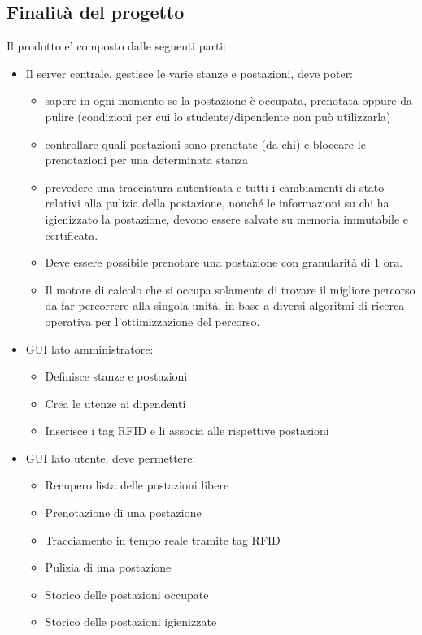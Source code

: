 \subsection{Finalità del progetto}
Il prodotto e' composto dalle seguenti parti:
\begin{itemize}
\item Il server centrale, gestisce le varie stanze e postazioni, deve poter:
\begin{itemize}
\item sapere in ogni momento se la postazione è occupata, prenotata oppure da pulire (condizioni per cui
lo studente/dipendente non può utilizzarla)
\item controllare quali postazioni sono prenotate (da chi) e bloccare le prenotazioni per una determinata
stanza
\item prevedere una tracciatura autenticata e tutti i cambiamenti di stato relativi alla pulizia della
postazione, nonché le informazioni su chi ha igienizzato la postazione, devono essere salvate su
memoria immutabile e certificata.
\item Deve essere possibile prenotare una postazione con granularità di 1 ora.
\item Il motore di calcolo che si occupa solamente di trovare il migliore percorso da far percorrere alla singola unità, in base a diversi algoritmi di ricerca operativa per l'ottimizzazione del percorso.
\end{itemize}
\item GUI lato amministratore:
\begin{itemize}
\item Definisce stanze e postazioni 
\item Crea le utenze ai dipendenti
\item Inserisce i tag RFID e li associa alle rispettive postazioni
\end{itemize}
\item GUI lato utente, deve permettere:
\begin{itemize}
\item Recupero lista delle postazioni libere
\item Prenotazione di una postazione
\item Tracciamento in tempo reale tramite tag RFID
\item Pulizia di una postazione
\item Storico delle postazioni occupate
\item Storico delle postazioni igienizzate
\end{itemize}
\end{itemize}

